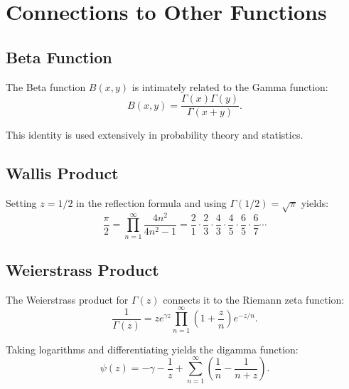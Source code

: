 \section{Connections to Other Functions}

\subsection{Beta Function}

The Beta function $B(x,y)$ is intimately related to the Gamma function:
\[
B(x,y) = \frac{\Gamma(x)\Gamma(y)}{\Gamma(x+y)}.
\]

This identity is used extensively in probability theory and statistics.

\subsection{Wallis Product}

Setting $z = 1/2$ in the reflection formula and using $\Gamma(1/2) = \sqrt{\pi}$ yields:
\[
\frac{\pi}{2} = \prod_{n=1}^\infty \frac{4n^2}{4n^2 - 1} = \frac{2}{1} \cdot \frac{2}{3} \cdot \frac{4}{3} \cdot \frac{4}{5} \cdot \frac{6}{5} \cdot \frac{6}{7} \cdots
\]

\subsection{Weierstrass Product}

The Weierstrass product for $\Gamma(z)$ connects it to the Riemann zeta function:
\[
\frac{1}{\Gamma(z)} = z e^{\gamma z} \prod_{n=1}^\infty \left(1 + \frac{z}{n}\right) e^{-z/n}.
\]

Taking logarithms and differentiating yields the digamma function:
\[
\psi(z) = -\gamma - \frac{1}{z} + \sum_{n=1}^\infty \left(\frac{1}{n} - \frac{1}{n+z}\right).
\]
